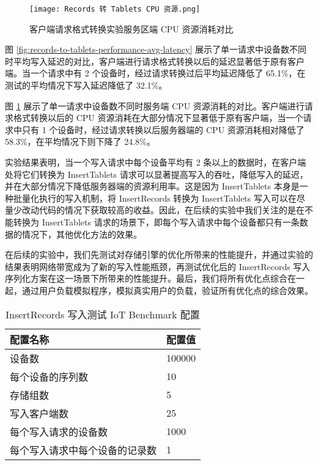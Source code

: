 \begin{figure}
  \centering
  \texttt{[image: Records 转 Tablets CPU 资源.png]}
  \caption{客户端请求格式转换实验服务区端 CPU 资源消耗对比}
  \label{fig:records-to-tablets-performance-cpu-consuming}
\end{figure}

图 \ref{fig:records-to-tablets-performance-avg-latency} 展示了单一请求中设备数不同时平均写入延迟的对比，客户端进行请求格式转换以后的延迟显著低于原有客户端。当一个请求中有 2 个设备时，经过请求转换过后平均延迟降低了 65.1\%，在测试的平均情况下写入延迟降低了 32.1\%。

图 \ref{fig:records-to-tablets-performance-cpu-consuming} 展示了单一请求中设备数不同时服务端 CPU 资源消耗的对比。客户端进行请求格式转换以后的 CPU 资源消耗在大部分情况下显著低于原有客户端，当一个请求中只有 1 个设备时，经过请求转换以后服务器端的 CPU 资源消耗相对降低了 58.3\%，在平均情况下则下降了 24.8\%。 %

实验结果表明，当一个写入请求中每个设备平均有 2 条以上的数据时，在客户端处将它们转换为 InsertTablets 请求可以显著提高写入的吞吐，降低写入的延迟，并在大部分情况下降低服务器端的资源利用率。这是因为 InsertTablets 本身是一种批量化执行的写入机制，将 InsertRecords 转换为 InsertTablets 写入可以在尽量少改动代码的情况下获取较高的收益。因此，在后续的实验中我们关注的是在不能转换为 InsertTablets 请求的场景下，即每个写入请求中每个设备都只有一条数据的情况下，其他优化方法的效果。

在后续的实验中，我们先测试对存储引擎的优化所带来的性能提升，并通过实验的结果表明网络带宽成为了新的写入性能瓶颈，再测试优化后的 InsertRecords 写入序列化方案在这一场景下所带来的性能提升。最后，我们将所有优化点综合在一起，通过用户负载模拟程序，模拟真实用户的负载，验证所有优化点的综合效果。

\begin{table}
  \centering
  \caption{InsertRecords 写入测试 IoT Benchmark 配置}
  \begin{tabular}{ll}
    \toprule
    配置名称 & 配置值 \\
    \midrule 
    设备数 & 100000 \\
    每个设备的序列数 & 10 \\
    存储组数 & 5 \\
    写入客户端数 & 25 \\
    每个写入请求的设备数 & 1000 \\
    每个写入请求中每个设备的记录数 & 1 \\
    \bottomrule
  \end{tabular}
  \label{tabular:test-req-format-iot-benchmark-config-2}
\end{table}

